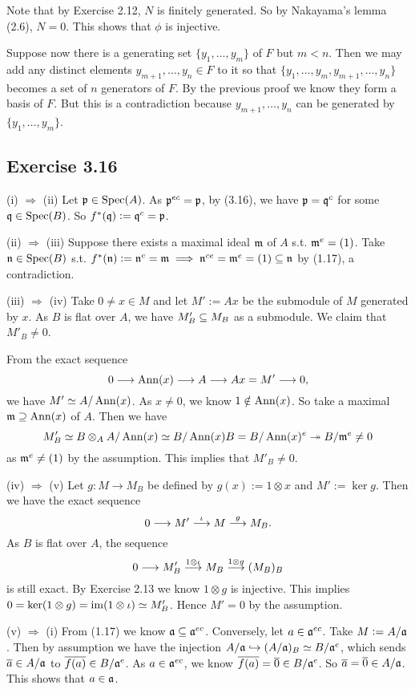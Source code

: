 \documentclass[../A&M.tex]{subfiles}
\begin{document}
Note that by Exercise 2.12, $N$ is finitely generated. So by Nakayama's lemma (2.6), $N=0$. This shows that $\phi$ is injective.

Suppose now there is a generating set $\{y_1,\ldots,y_m\}$ of $F$ but $m<n$. Then we may add any distinct elements $y_{m+1},\ldots,y_n \in F$ to it so that $\{y_1,\ldots,y_m,y_{m+1},\ldots,y_n\}$ becomes a set of $n$ generators of $F$. By the previous proof we know they form a basis of $F$. But this is a contradiction because $y_{m+1},\ldots,y_n$ can be generated by $\{y_1,\ldots,y_m\}$.

\subsection*{Exercise 3.16}

(i) $\Rightarrow$ (ii) Let $\mathfrak{p} \in \operatorname{Spec}(A)$. As $\mathfrak{p}^{ec} = \mathfrak{p}$, by (3.16), we have $\mathfrak{p} = \mathfrak{q}^c$ for some $\mathfrak{q}\in\operatorname{Spec}(B)$. So $f^*(\mathfrak{q}) := \mathfrak{q}^c = \mathfrak{p}$.

(ii) $\Rightarrow$ (iii) Suppose there exists a maximal ideal $\mathfrak{m}$ of $A$ s.t. $\mathfrak{m}^e=(1)$. Take $\mathfrak{n} \in \operatorname{Spec}(B)$ s.t. $f^*(\mathfrak{n}) := \mathfrak{n}^c = \mathfrak{m} \implies \mathfrak{n}^{ce} = \mathfrak{m}^e = (1) \subseteq \mathfrak{n}$ by (1.17), a contradiction.

(iii) $\Rightarrow$ (iv) Take $0\neq x \in M$ and let $M' := Ax$ be the submodule of $M$ generated by $x$. As $B$ is flat over $A$, we have $M'_B \subseteq M_B$ as a submodule. We claim that $M'_B\neq0$. 

From the exact sequence
$$
0 \longrightarrow \operatorname{Ann}(x) \longrightarrow A \longrightarrow Ax = M' \longrightarrow 0,
$$
we have $M' \simeq A/\operatorname{Ann}(x)$. As $x\neq0$, we know $1 \notin \operatorname{Ann}(x)$. So take a maximal $\mathfrak{m} \supseteq \operatorname{Ann}(x)$ of $A$. Then we have
$$
M'_B \simeq B \otimes_A A/\operatorname{Ann}(x) \simeq B/\operatorname{Ann}(x)B = B/\operatorname{Ann}(x)^e \twoheadrightarrow B/\mathfrak{m}^e \neq 0
$$
as $\mathfrak{m}^e \neq (1)$ by the assumption. This implies that $M'_B \neq 0$.

(iv) $\Rightarrow$ (v) Let $g: M\to M_B$ be defined by $g(x):=1\otimes x$ and $M':=\ker g$. Then we have the exact sequence
$$
0 \longrightarrow M' \overset{\iota}{\longrightarrow} M \overset{g}{\longrightarrow} M_B.
$$
As $B$ is flat over $A$, the sequence
$$
0 \longrightarrow M'_B \overset{1 \otimes \iota}{\longrightarrow} M_B \overset{1 \otimes g}{\longrightarrow} (M_B)_B
$$
is still exact. By Exercise 2.13 we know $1\otimes g$ is injective. This implies $0 = \ker(1\otimes g) = \operatorname{im}(1\otimes \iota) \simeq M'_B$. Hence $M'=0$ by the assumption.

(v) $\Rightarrow$ (i) From (1.17) we know $\mathfrak{a} \subseteq \mathfrak{a}^{ec}$. Conversely, let $a\in\mathfrak{a}^{ec}$. Take $M:=A/\mathfrak{a}$. Then by assumption we have the injection $A/\mathfrak{a} \hookrightarrow (A/\mathfrak{a})_B \simeq B/\mathfrak{a}^e$, which sends $\overline{a}\in A/\mathfrak{a}$ to $\overline{f(a)} \in B/\mathfrak{a}^e$. As $a \in \mathfrak{a}^{ec}$, we know $\overline{f(a)} = \overline{0} \in B/\mathfrak{a}^e$. So $\overline{a} = \overline{0} \in A/\mathfrak{a}$. This shows that $a\in\mathfrak{a}$.
\end{document}
